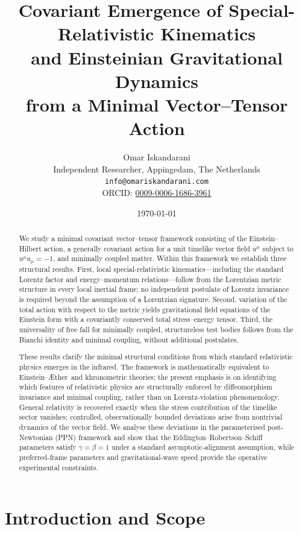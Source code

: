 \documentclass[12pt,a4paper]{article}
\title{Covariant Emergence of Special-Relativistic Kinematics\\
       and Einsteinian Gravitational Dynamics\\
       from a Minimal Vector--Tensor Action}
\author{%
  Omar Iskandarani\\[0.25em]
  \normalsize Independent Researcher, Appingedam, The Netherlands\\
  \normalsize \texttt{info@omariskandarani.com}\\
  \normalsize ORCID: \href{https://orcid.org/0009-0006-1686-3961}{0009-0006-1686-3961}%
}
\date{\today}
\newcommand{\Aether}{\AE ther}
\begin{document}
\maketitle

\begin{abstract}

We study a minimal covariant vector--tensor framework consisting of the
Einstein--Hilbert action, a generally covariant action for a unit timelike
vector field $u^{\mu}$ subject to $u^{\mu}u_{\mu}=-1$, and minimally coupled
matter. Within this framework we establish three structural results. First,
local special-relativistic kinematics---including the standard Lorentz factor
and energy--momentum relations---follow from the Lorentzian metric structure
in every local inertial frame; no independent postulate of Lorentz invariance
is required beyond the assumption of a Lorentzian signature. Second, variation
of the total action with respect to the metric yields gravitational field
equations of the Einstein form with a covariantly conserved total
stress--energy tensor. Third, the universality of free fall for minimally
coupled, structureless test bodies follows from the Bianchi identity and
minimal coupling, without additional postulates.

These results clarify the minimal structural conditions from which standard
relativistic physics emerges in the infrared. The framework is mathematically
equivalent to Einstein--\Aether\ and khronometric theories; the present
emphasis is on identifying which features of relativistic physics are
structurally enforced by diffeomorphism invariance and minimal coupling,
rather than on Lorentz-violation phenomenology. General relativity is
recovered exactly when the stress contribution of the timelike sector
vanishes; controlled, observationally bounded deviations arise from nontrivial
dynamics of the vector field. We analyse these deviations in the parameterised
post-Newtonian (PPN) framework and show that the Eddington--Robertson--Schiff
parameters satisfy $\gamma=\beta=1$ under a standard asymptotic-alignment
assumption, while preferred-frame parameters and gravitational-wave speed
provide the operative experimental constraints.
\end{abstract}

\section{Introduction and Scope}
\label{sec:intro}
\end{document}
